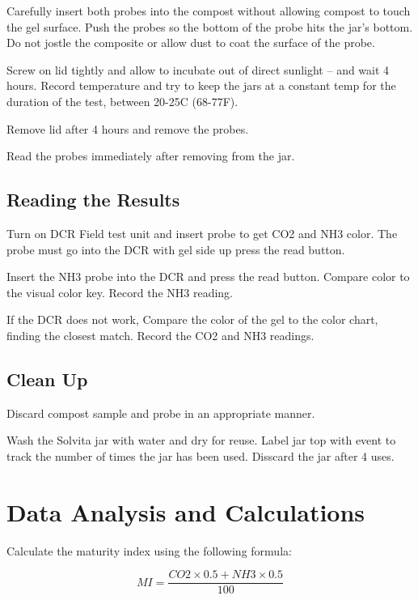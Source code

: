 \documentclass[12pt]{../SOP4_alpha}\usepackage[]{graphicx}\usepackage[]{xcolor}
\begin{document}
\NP Carefully insert both probes into the compost without allowing compost to touch the gel surface. Push the probes so the bottom of the probe hits the jar's bottom. Do not jostle the composite or allow dust to coat the surface of the probe. 

\NP Screw on lid tightly and allow to incubate out of direct sunlight -- and wait 4 hours. Record temperature and try to keep the jars at a constant temp for the duration of the test, between 20-25\textdegree C (68-77\textdegree F).

\NP Remove lid after 4 hours and remove the probes. 

\NP Read the probes immediately after removing from the jar.


\subsection{Reading the Results}

\NP Turn on DCR Field test unit and insert probe to get CO2 and NH3 color. The probe must go into the DCR with gel side up press the read button. 

\NP Insert the NH3 probe into the DCR and press the read button. Compare color to the visual color key. Record the NH3 reading.

\NP If the DCR does not work, Compare the color of the gel to the color chart, finding the closest match. Record the CO2 and NH3 readings.


\subsection{Clean Up}

\NP Discard compost sample and probe in an appropriate manner.

\NP Wash the Solvita jar with water and dry for reuse. Label jar top with event to track the number of times the jar has been used. Disscard the jar after 4 uses.

\section{Data Analysis and Calculations}

\NP Calculate the maturity index using the following formula:

\begin{equation}
MI = \frac{CO2 \times 0.5 + NH3 \times 0.5}{100}
\end{equation}
\end{document}

